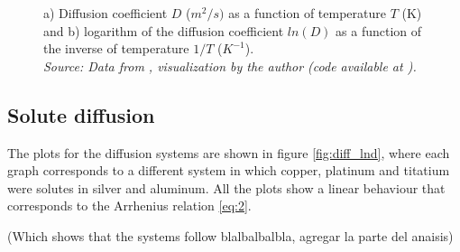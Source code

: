 \begin{figure}[h]
 \centering
 \captionsetup{justification=centering}
 \caption{a) Diffusion coefficient $D$ ($m^2/s)$ as a function of temperature $T$ (K) and b) logarithm of the diffusion coefficient $ln(D)$ as a function of the inverse of temperature $1/T$ ($K^{-1}$). \\
 \textit{Source: Data from \citep{kakusan}, visualization by the author (code available at \citep{mygit}).}}
 \label{fig:diffusion}
\end{figure}

\subsection{Solute diffusion}

The plots for the diffusion systems are shown in figure \ref{fig:diff_lnd}, where each graph corresponds to a different system in which copper, platinum and titatium were solutes in silver and aluminum. All the plots show a linear behaviour that corresponds to the Arrhenius relation \ref{eq:2}. 

(Which shows that the systems follow blalbalbalbla, agregar la parte del anaisis)

